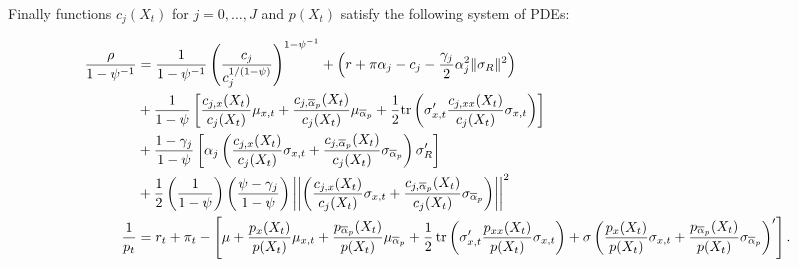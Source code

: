 Finally functions $ c_j(X_t) $ for $ j=0,\ldots,J $ and $ p(X_t) $ satisfy the following system of PDEs:
\begin{footnotesize}
	\begin{align}\label{eq:PDEs}
		\frac{\rho}{1-\psi^{-1}}&=\frac{1}{1-\psi^{-1}}\left(\frac{c_j}{c_j^{1/(1-\psi)}}\right)^{1-\psi^{-1}}+
		\left(r+\pi\alpha_{j}-c_j-\frac{\gamma_j}{2}\alpha_j^2\|\sigma_{R}\|^2\right)\nonumber\\
		&+\frac{1}{1-\psi}\left[\frac{c_{j,x}(X_t)}{c_j(X_t)}\mu_{x,t}+\frac{c_{j,\overline{\alpha}_p}(X_t)}{c_j(X_t)}\mu_{\overline{\alpha}_p}+
		\frac{1}{2}\text{tr}\left(\sigma_{x,t}'\frac{c_{j,xx}(X_t)}{c_j(X_t)}\sigma_{x,t}\right)\right]\nonumber\\
		&+\frac{1-\gamma_j}{1-\psi}\left[\alpha_j\left(\frac{c_{j,x}(X_t)}{c_j(X_t)} \sigma_{x,t} + \frac{c_{j,{\overline{\alpha}_p}}(X_t)}{c_j(X_t)}\sigma_{\overline{\alpha}_p}\right)\sigma_R'\right]\nonumber\\
		&+\frac{1}{2}\left(\frac{1}{1-\psi}\right)\left(\frac{\psi-\gamma_j}{1-\psi}\right)\left|\left|\left(\frac{c_{j,x}(X_t)}{c_j(X_t)} \sigma_{x,t} + \frac{c_{j,{\overline{\alpha}_p}}(X_t)}{c_j(X_t)}\sigma_{\overline{\alpha}_p}\right)\right|\right|^2\\
		\frac{1}{p_t} &= r_t + \pi_t  -\left[\mu +\frac{p_x(X_t)}{p(X_t)}\mu_{x,t}+\frac{p_{\overline{\alpha}_p}(X_t)}{p(X_t)}\mu_{\overline{\alpha}_p}+\frac{1}{2}\operatorname{tr}\left(\sigma_{x,t}'\frac{p_{xx}(X_t)}{p(X_t)}\sigma_{x,t}\right) + \sigma \left(\frac{p_x(X_t)}{p(X_t)} \sigma_{x,t} + \frac{p_{\overline{\alpha}_p}(X_t)}{p(X_t)} \sigma_{\overline{\alpha}_p}\right)'\right].
	\end{align}
\end{footnotesize}





